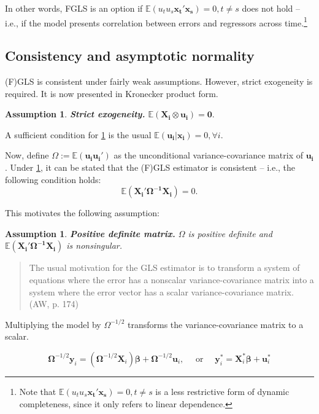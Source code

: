 \documentclass[11pt, a4paper]{report}
\theoremstyle{plain}
\newtheorem{assump}[thm]{Assumption}
\theoremstyle{plain}
\theoremstyle{remark}
\begin{document}
In other words, FGLS is an option if $\mathbb{E}(u_t u_s \mathbf{x_t'x_s}) = 0, t \neq s$ does not hold -- i.e., if the model presents correlation between errors and regressors across time.\footnote{Note that $\mathbb{E}(u_t u_s \mathbf{x_t'x_s}) = 0, t \neq s$ is a less restrictive form of dynamic completeness, since it only refers to linear dependence.}

\subsection{Consistency and asymptotic normality}

(F)GLS is consistent under fairly weak assumptions. However, strict exogeneity is required. It is now presented in Kronecker product form.

\begin{assump}
    \textbf{Strict exogeneity.} \label{strict_kron} $\mathbb{E}(\mathbf{X_i} \otimes \mathbf{u_i}) = \mathbf{0}.$
\end{assump}

A sufficient condition for \ref{strict_kron} is the usual $\mathbb{E}(\mathbf{u_i}|\mathbf{x_i}) = 0, \forall i$. 

Now, define $\Omega := \mathbb{\mathbb{E}(\mathbf{u_i u_i'})}$ as the unconditional variance-covariance matrix of $\mathbf{u_i}$. Under \ref{strict_kron}, it can be stated that the (F)GLS estimator is consistent -- i.e., the following condition holds:
\begin{equation}
    \mathbb{E}(\mathbf{X_i' \Omega^{-1} X_i}) = 0.
\end{equation}

This motivates the following assumption: 
\begin{assump}
    \textbf{Positive definite matrix.} \label{positive_definite} $\Omega$ is positive definite and $\mathbb{E}(\mathbf{X_i' \Omega^{-1} X_i})$ is nonsingular. 
\end{assump}

\begin{quote}
The usual motivation for the GLS estimator is to transform a system of equations
where the error has a nonscalar variance-covariance matrix into a system where the
error vector has a scalar variance-covariance matrix. (AW, p. 174)
\end{quote}

Multiplying the model by $\Omega^{-1/2}$ transforms the variance-covariance matrix to a scalar.

\begin{equation}
    \boldsymbol{\Omega}^{-1 / 2} \mathbf{y}_{i}=\left(\boldsymbol{\Omega}^{-1 / 2} \mathbf{X}_{i}\right) \boldsymbol{\beta}+\boldsymbol{\Omega}^{-1 / 2} \mathbf{u}_{i}, \quad \text { or } \quad \mathbf{y}_{i}^{*}=\mathbf{X}_{i}^{*} \boldsymbol{\beta}+\mathbf{u}_{i}^{*}
\end{equation}
\end{document}
